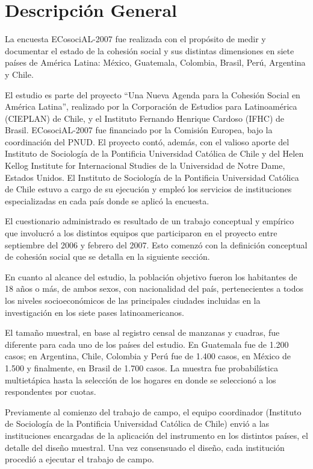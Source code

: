 \documentclass[
  12pt,
]{book}
\begin{document}
\hypertarget{descripciuxf3n-general-4}{%
\section{Descripción General}\label{descripciuxf3n-general-4}}

La encuesta ECosociAL-2007 fue realizada con el propósito de medir y
documentar el estado de la cohesión social y sus distintas dimensiones
en siete países de América Latina: México, Guatemala, Colombia, Brasil,
Perú, Argentina y Chile.

El estudio es parte del proyecto ``Una Nueva Agenda para la Cohesión
Social en América Latina'', realizado por la Corporación de Estudios para
Latinoamérica (CIEPLAN) de Chile, y el Instituto Fernando Henrique
Cardoso (IFHC) de Brasil. ECosociAL-2007 fue financiado por la Comisión
Europea, bajo la coordinación del PNUD. El proyecto contó, además, con
el valioso aporte del Instituto de Sociología de la Pontificia
Universidad Católica de Chile y del Helen Kellog Institute for
Internacional Studies de la Universidad de Notre Dame, Estados Unidos.
El Instituto de Sociología de la Pontificia Universidad Católica de
Chile estuvo a cargo de su ejecución y empleó los servicios de
instituciones especializadas en cada país donde se aplicó la encuesta.

El cuestionario administrado es resultado de un trabajo conceptual y
empírico que involucró a los distintos equipos que participaron en el
proyecto entre septiembre del 2006 y febrero del 2007. Esto comenzó con
la definición conceptual de cohesión social que se detalla en la
siguiente sección.

En cuanto al alcance del estudio, la población objetivo fueron los
habitantes de 18 años o más, de ambos sexos, con nacionalidad del país,
pertenecientes a todos los niveles socioeconómicos de las principales
ciudades incluidas en la investigación en los siete pases
latinoamericanos.

El tamaño muestral, en base al registro censal de manzanas y cuadras,
fue diferente para cada uno de los países del estudio. En Guatemala fue
de 1.200 casos; en Argentina, Chile, Colombia y Perú fue de 1.400 casos,
en México de 1.500 y finalmente, en Brasil de 1.700 casos. La muestra
fue probabilística multietápica hasta la selección de los hogares en
donde se seleccionó a los respondentes por cuotas.

Previamente al comienzo del trabajo de campo, el equipo coordinador
(Instituto de Sociología de la Pontificia Universidad Católica de Chile)
envió a las instituciones encargadas de la aplicación del instrumento en
los distintos países, el detalle del diseño muestral. Una vez
consensuado el diseño, cada institución procedió a ejecutar el trabajo
de campo.
\end{document}
